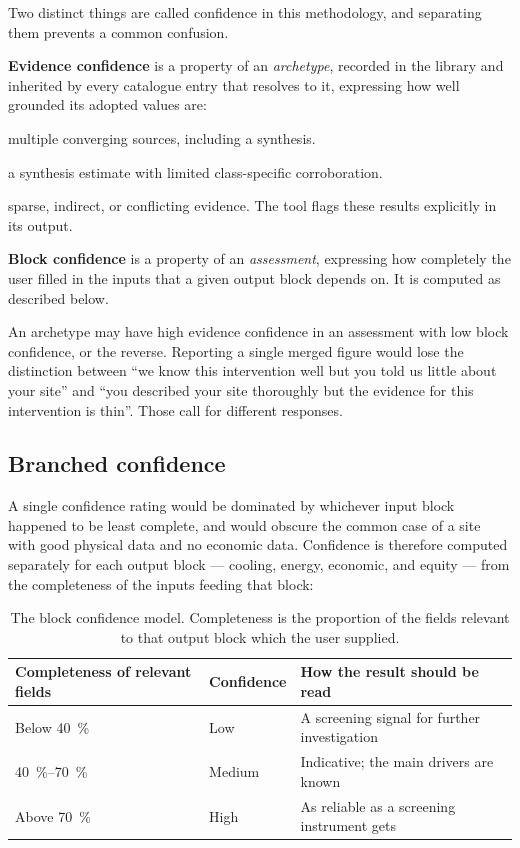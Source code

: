 Two distinct things are called confidence in this methodology, and separating
them prevents a common confusion.

\textbf{Evidence confidence} is a property of an \emph{archetype}, recorded in
the library and inherited by every catalogue entry that resolves to it,
expressing how well grounded its adopted values are:

\begin{description}[leftmargin=1.5em, style=sameline, font=\normalfont\itshape]
  \item[High] multiple converging sources, including a synthesis.
  \item[Medium] a synthesis estimate with limited class-specific
  corroboration.
  \item[Low] sparse, indirect, or conflicting evidence. The tool flags these
  results explicitly in its output.
\end{description}

\textbf{Block confidence} is a property of an \emph{assessment}, expressing how
completely the user filled in the inputs that a given output block depends on.
It is computed as described below.

An archetype may have high evidence confidence in an assessment with low block
confidence, or the reverse. Reporting a single merged figure would lose the
distinction between ``we know this intervention well but you told us little
about your site'' and ``you described your site thoroughly but the evidence for
this intervention is thin''. Those call for different responses.

\subsection{Branched confidence}
\label{sec:confidence}

A single confidence rating would be dominated by whichever input block happened
to be least complete, and would obscure the common case of a site with good
physical data and no economic data. Confidence is therefore computed separately
for each output block --- cooling, energy, economic, and equity --- from the
completeness of the inputs feeding that block:

\begin{table}[H]
\centering
\caption[The confidence model]{The block confidence model. Completeness is the
proportion of the fields relevant to that output block which the user
supplied.}
\label{tab:confidence}
\small
\begin{tabular}{@{}lll@{}}
\toprule
\textbf{Completeness of relevant fields} & \textbf{Confidence} &
\textbf{How the result should be read} \\
\midrule
Below \SI{40}{\percent}   & Low    & A screening signal for further investigation \\
\SIrange{40}{70}{\percent} & Medium & Indicative; the main drivers are known \\
Above \SI{70}{\percent}   & High   & As reliable as a screening instrument gets \\
\bottomrule
\end{tabular}
\end{table}

